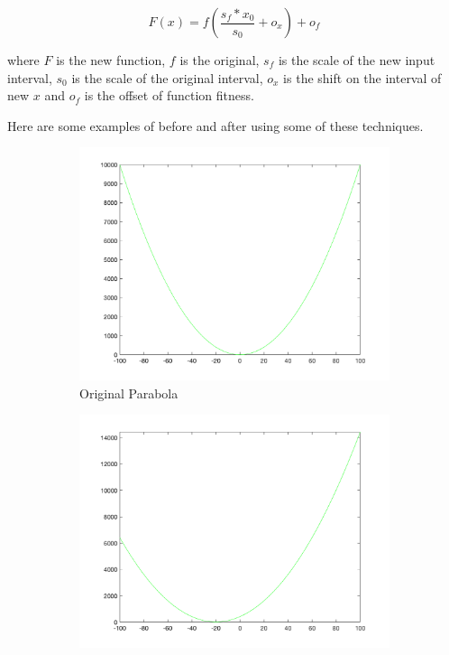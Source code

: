 $$
  F(x) = f\left(\frac{s_f * x_0}{s_0} + o_x\right) + o_f
$$

where $F$ is the new function, $f$ is the original, $s_f$ is the scale of the new input interval, $s_0$ is the scale of the original interval, $o_x$ is the shift on the interval of new $x$ and $o_f$ is the offset of function fitness.

\par Here are some examples of before and after using some of these techniques.


\begin{figure}
  \centering
  \begin{subfigure}[b]{0.6\textwidth}
    \includegraphics[width=\textwidth]{img/translates/parabola/loa-graph-orig}
    \caption{Original Parabola}
  \end{subfigure}
  \begin{subfigure}[b]{0.6\textwidth}
    \includegraphics[width=\textwidth]{img/translates/parabola/loa-graph-shift}

\end{subfigure}
\end{figure}
